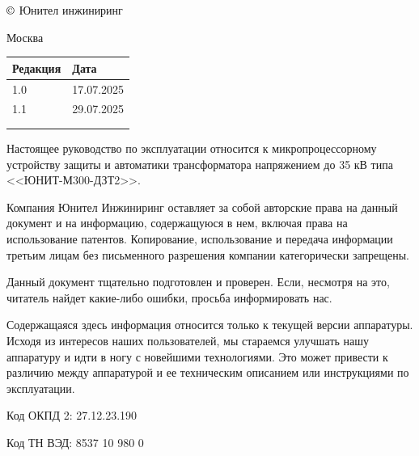 \documentclass[a4paper, 12pt,table, hidelinks, DIV=calc]{extarticle} %
\begin{document}
\begin{flushleft}
\noindent
$\copyright$
\the\year{}
Юнител инжиниринг

\vskip 3mm
Москва
\vskip 8mm

\setlength{\extrarowheight}{0.4cm} %
\begin{longtable}[l]{|>{\centering}m{4cm}|>{\centering\arraybackslash}m{4cm}|}%
    \hline
	Редакция & Дата \\
    \hline
	\textcolor{unigray}{1.0} & \textcolor{unigray}{17.07.2025} \\
    \hline
	\textcolor{unigray}{1.1} & \textcolor{unigray}{29.07.2025} \\
    \hline
     &  \\
    \hline  
    &  \\
    \hline 
                        
\end{longtable}

\vskip 70mm
\noindent
Настоящее руководство по эксплуатации относится к микропроцессорному устройству защиты и автоматики трансформатора напряжением до 35 кВ типа <<ЮНИТ-М300-ДЗТ2>>.

\vskip 10mm
Компания Юнител Инжиниринг оставляет за собой авторские права на данный документ и на информацию, содержащуюся в нем, включая права на использование патентов. Копирование, использование и передача информации третьим лицам без письменного разрешения компании категорически запрещены.

\vskip 10mm
Данный документ тщательно подготовлен и проверен. Если, несмотря на это, читатель найдет какие-либо ошибки, просьба информировать нас.

\vskip 10mm
Содержащаяся здесь информация относится только к текущей версии аппаратуры. Исходя из интересов наших пользователей, мы стараемся улучшать нашу аппаратуру и идти в ногу с новейшими технологиями. Это может привести к различию между аппаратурой и ее техническим описанием или инструкциями по эксплуатации.

\vskip 10mm
Код ОКПД 2: 27.12.23.190 %

\vskip 5mm
Код ТН ВЭД: 8537 10 980 0 %

\end{flushleft}\clearpage
\newpage

\clearpage
\newpage
{}
\end{document}

